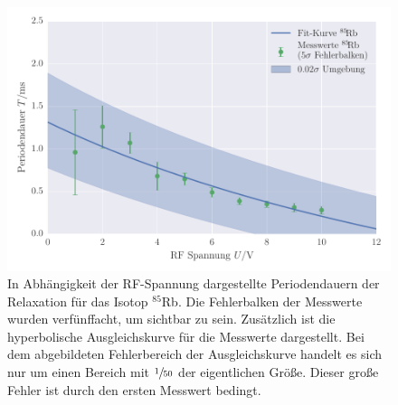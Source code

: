 \FloatBarrier
\begin{figure}[!h]
\centering
\includegraphics[scale=.8]{../Grafiken/Transienteneffekt_Rubidium_85.pdf}
\caption{In Abhängigkeit der RF-Spannung dargestellte Periodendauern der Relaxation
	für das Isotop ${}^{85}\!$Rb. Die Fehlerbalken der Messwerte wurden verfünffacht, 
	um sichtbar zu sein. Zusätzlich ist die hyperbolische Ausgleichskurve für die Messwerte
	dargestellt. Bei dem abgebildeten Fehlerbereich der Ausgleichskurve handelt es sich nur 
	um einen Bereich mit $\sfrac{1}{50}$ der eigentlichen Größe. Dieser große Fehler ist durch 
	den ersten Messwert bedingt. \label{fig:transienteneffekt_rubidium_85}}
\end{figure}
\FloatBarrier